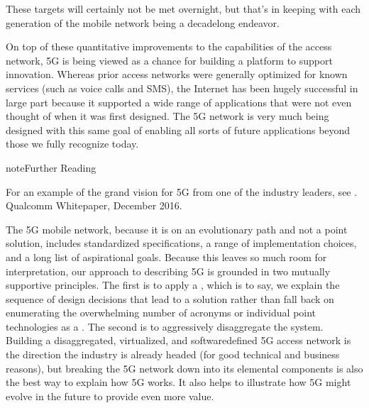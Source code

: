 \documentclass[a4paper,11pt,english]{sphinxmanual}
\begin{document}
\sphinxAtStartPar
These targets will certainly not be met overnight, but that’s in keeping
with each generation of the mobile network being a decade\sphinxhyphen{}long
endeavor.

\sphinxAtStartPar
On top of these quantitative improvements to the capabilities of the access
network, 5G is being viewed as a chance for building a platform to
support innovation. Whereas prior access networks were generally
optimized for known services (such as voice calls and SMS), the
Internet has been hugely successful in large part because it supported
a wide range of applications that were not even thought of when it was
first designed. The 5G network is very much being designed with this
same goal of enabling all sorts of future applications beyond those we
fully recognize today.

\label{\detokenize{intro:reading-vision}}
\begin{sphinxadmonition}{note}{Further Reading}

\sphinxAtStartPar
For an example of the grand vision for 5G from one of the industry
leaders, see .
Qualcomm Whitepaper, December 2016.
\end{sphinxadmonition}

\sphinxAtStartPar
The 5G mobile network, because it is on an
evolutionary path and not a point solution, includes standardized
specifications, a range of implementation choices, and a long list of
aspirational goals. Because this leaves so much room for interpretation,
our approach to describing 5G is grounded in two mutually supportive
principles. The first is to apply a , which is to say, we
explain the sequence of design decisions that lead to a solution rather
than fall back on enumerating the overwhelming number of acronyms or
individual point technologies as a
. The second is to aggressively disaggregate the system.
Building a disaggregated, virtualized, and software\sphinxhyphen{}defined 5G access
network is the direction the industry is already headed (for good
technical and business reasons), but breaking the 5G network down into
its elemental components is also the best way to explain how 5G works.
It also helps to illustrate how 5G might evolve in the future to provide
even more value.
\end{document}
